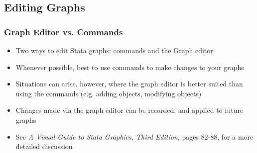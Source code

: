 \documentclass{beamer}
\begin{document}
\subsection{Editing Graphs}
\begin{frame}
	\frametitle{Graph Editor vs. Commands}
	
	\begin{itemize}
		\item Two ways to edit Stata graphs: commands and the Graph editor
		\item Whenever possible, best to use commands to make changes to your graphs
		\item Situations can arise, however, where the graph editor is better suited than using the commands (e.g. adding objects, modifying objects)
		\item Changes made via the graph editor can be recorded, and applied to future graphs
		\item See \textit{A Visual Guide to Stata Graphics, Third Edition}, pages 82-88, for a more detailed discussion 
	\end{itemize}
\end{frame}
\end{document}
